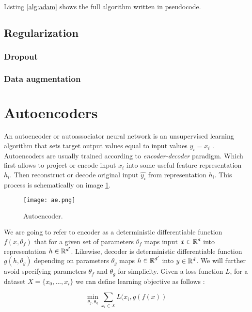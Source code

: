 Listing \ref{alg:adam} shows the full algorithm written in pseudocode.



\subsection{Regularization}
\subsubsection{Dropout}
\subsubsection{Data augmentation}





\section{Autoencoders}\label{ch:ae}
An autoencoder or autoassociator neural network is an unsupervised learning algorithm that sets target output values equal to input values $y_i=x_i$ \cite{Ng2011,RanzatoMarcAurelio2007}.
Autoencoders are usually trained according to \textit{encoder-decoder} paradigm.
Which first allows to project or encode input $x_i$ into some useful feature representation $h_i$.
Then reconstruct or decode original input $\hat{y_i}$ from representation $h_i$.
This process is schematically on image \ref{fig:ae}.

\begin{figure}[h!]
  \centering
    \texttt{[image: ae.png]}
  \caption{Autoencoder.}
  \label{fig:ae}
\end{figure}



We are going to refer to encoder as a deterministic differentiable function $f(x, \theta_f)$ that for a given set of parameters $\theta_f$ maps input $x\in \Bbb{R}^d$ into representation $h \in \Bbb{R}^{d'}$.
Likewise, decoder is deterministic differentiable function $g(h, \theta_g)$ depending on parameters $\theta_g$ maps $h\in\Bbb{R}^{d'}$ into $y\in \Bbb{R}^d$. We will further avoid specifying parameters $\theta_f$ and $\theta_g$ for simplicity.
Given a loss function $L$, for a dataset $X=\{x_0, ..., x_i\}$ we can define learning objective as follows \cite{Good2016}:

\begin{equation}\label{eq:ae}
\min_{\theta_f, \theta_g}\sum\limits_{x_i \in X}{L(x_i, g(f(x))}
\end{equation}

